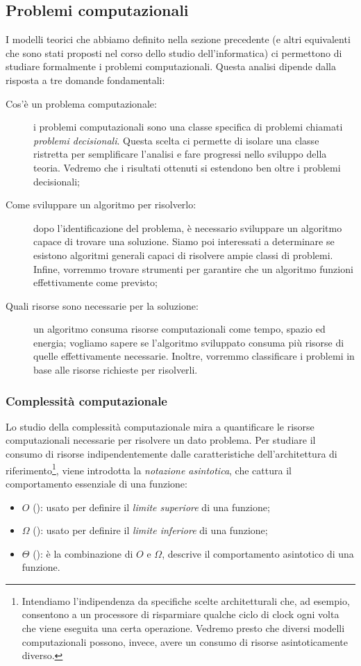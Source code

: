 \subsection{Problemi computazionali}
I modelli teorici che abbiamo definito nella sezione precedente (e altri equivalenti che sono stati proposti nel corso dello studio dell'informatica) ci permettono di studiare formalmente i problemi computazionali. Questa analisi dipende dalla risposta a tre domande fondamentali:
\begin{description}
	\item[Cos'è un problema computazionale:] i problemi computazionali sono una classe specifica di problemi chiamati \emph{problemi decisionali}. Questa scelta ci permette di isolare una classe ristretta per semplificare l'analisi e fare progressi nello sviluppo della teoria. Vedremo che i risultati ottenuti si estendono ben oltre i problemi decisionali;
	\item[Come sviluppare un algoritmo per risolverlo:] dopo l'identificazione del problema, è necessario sviluppare un algoritmo capace di trovare una soluzione. Siamo poi interessati a determinare se esistono algoritmi generali capaci di risolvere ampie classi di problemi. Infine, vorremmo trovare strumenti per garantire che un algoritmo funzioni effettivamente come previsto;
	\item[Quali risorse sono necessarie per la soluzione:] un algoritmo consuma risorse computazionali come tempo, spazio ed energia; vogliamo sapere se l'algoritmo sviluppato consuma più risorse di quelle effettivamente necessarie. Inoltre, vorremmo classificare i problemi in base alle risorse richieste per risolverli.
\end{description}

\subsubsection*{Complessità computazionale}
Lo studio della complessità computazionale mira a quantificare le risorse computazionali necessarie per risolvere un dato problema. Per studiare il consumo di risorse indipendentemente dalle caratteristiche dell'architettura di riferimento\footnote{Intendiamo l'indipendenza da specifiche scelte architetturali che, ad esempio, consentono a un processore di risparmiare qualche ciclo di clock ogni volta che viene eseguita una certa operazione. Vedremo presto che diversi modelli computazionali possono, invece, avere un consumo di risorse asintoticamente diverso.}, viene introdotta la \emph{notazione asintotica}, che cattura il comportamento essenziale di una funzione:
\begin{itemize}
	\item $O$ (): usato per definire il \emph{limite superiore} di una funzione;
	\item $\Omega$ (): usato per definire il \emph{limite inferiore} di una funzione;
	\item $\Theta$ (): è la combinazione di $O$ e $\Omega$, descrive il comportamento asintotico di una funzione.
\end{itemize}


